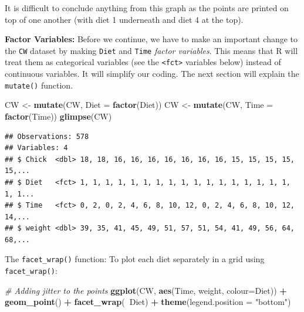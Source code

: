 \documentclass[]{book}
\newenvironment{Shaded}{\begin{snugshade}}{\end{snugshade}}
\newcommand{\CommentTok}[1]{\textcolor[rgb]{0.56,0.35,0.01}{\textit{#1}}}
\newcommand{\DataTypeTok}[1]{\textcolor[rgb]{0.13,0.29,0.53}{#1}}
\newcommand{\KeywordTok}[1]{\textcolor[rgb]{0.13,0.29,0.53}{\textbf{#1}}}
\newcommand{\NormalTok}[1]{#1}
\newcommand{\OperatorTok}[1]{\textcolor[rgb]{0.81,0.36,0.00}{\textbf{#1}}}
\newcommand{\StringTok}[1]{\textcolor[rgb]{0.31,0.60,0.02}{#1}}
\theoremstyle{definition}
\theoremstyle{definition}
\theoremstyle{definition}
\theoremstyle{remark}
\begin{document}
It is difficult to conclude anything from this graph as the points are printed on top of
one another (with diet 1 underneath and diet 4 at the top).

\textbf{Factor Variables:}
Before we continue, we have to make an important change to the \texttt{CW} dataset by making
\texttt{Diet} and \texttt{Time} \emph{factor variables}. This means that R will treat them as categorical
variables (see the \texttt{\textless{}fct\textgreater{}} variables below) instead of continuous variables. It will
simplify our coding. The next section will explain the \texttt{mutate()} function.

\begin{Shaded}
\begin{Highlighting}[]
\NormalTok{CW <-}\StringTok{ }\KeywordTok{mutate}\NormalTok{(CW, }\DataTypeTok{Diet =} \KeywordTok{factor}\NormalTok{(Diet))}
\NormalTok{CW <-}\StringTok{ }\KeywordTok{mutate}\NormalTok{(CW, }\DataTypeTok{Time =} \KeywordTok{factor}\NormalTok{(Time))}
\KeywordTok{glimpse}\NormalTok{(CW)}
\end{Highlighting}
\end{Shaded}

\begin{verbatim}
## Observations: 578
## Variables: 4
## $ Chick  <dbl> 18, 18, 16, 16, 16, 16, 16, 16, 16, 15, 15, 15, 15, 15,...
## $ Diet   <fct> 1, 1, 1, 1, 1, 1, 1, 1, 1, 1, 1, 1, 1, 1, 1, 1, 1, 1, 1...
## $ Time   <fct> 0, 2, 0, 2, 4, 6, 8, 10, 12, 0, 2, 4, 6, 8, 10, 12, 14,...
## $ weight <dbl> 39, 35, 41, 45, 49, 51, 57, 51, 54, 41, 49, 56, 64, 68,...
\end{verbatim}

The \texttt{facet\_wrap()} function: To plot each diet separately in a grid using \texttt{facet\_wrap()}:

\begin{Shaded}
\begin{Highlighting}[]
\CommentTok{# Adding jitter to the points}
\KeywordTok{ggplot}\NormalTok{(CW, }\KeywordTok{aes}\NormalTok{(Time, weight, }\DataTypeTok{colour=}\NormalTok{Diet)) }\OperatorTok{+}
\StringTok{  }\KeywordTok{geom_point}\NormalTok{() }\OperatorTok{+}
\StringTok{  }\KeywordTok{facet_wrap}\NormalTok{(}\OperatorTok{~}\NormalTok{Diet) }\OperatorTok{+}
\StringTok{  }\KeywordTok{theme}\NormalTok{(}\DataTypeTok{legend.position =} \StringTok{"bottom"}\NormalTok{)}
\end{Highlighting}
\end{Shaded}
\end{document}
